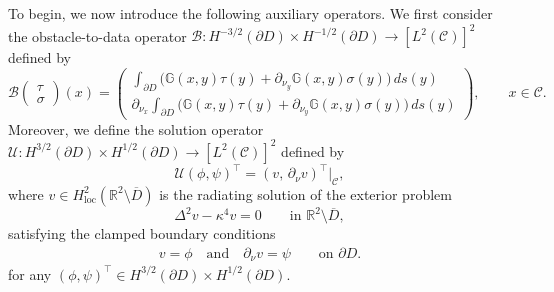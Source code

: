 \documentclass{article}
\begin{document}
To begin, we now introduce the following auxiliary operators. We first consider the obstacle-to-data operator
$\mathcal B : H^{-3/2}(\partial D)\times H^{-1/2}(\partial D)
\to [L^2(\mathcal C)]^2$ defined by
\begin{equation}
\mathcal B
\begin{pmatrix}
\tau\\
\sigma
\end{pmatrix}(x)
=
\begin{pmatrix}
\displaystyle
\int_{\partial D}
\Big(
\mathbb G(x,y)\tau(y)
+
\partial_{\nu_y}\mathbb G(x,y)\sigma(y)
\Big)\,ds(y)
\\[2ex]
\displaystyle
\partial_{\nu_x}
\int_{\partial D}
\Big(
\mathbb G(x,y)\tau(y)
+
\partial_{\nu_y}\mathbb G(x,y)\sigma(y)
\Big)\,ds(y)
\end{pmatrix},
\qquad x \in \mathcal C.
\end{equation}
Moreover, we define the solution operator
$\mathcal U : H^{3/2}(\partial D)\times H^{1/2}(\partial D)
\to [L^2(\mathcal C)]^2$
defined by
\begin{equation}\label{soln_operator}
\mathcal U(\phi, \psi)^\top = \left(v, \, \partial_{\nu} v\right)^\top\Big|_{\mathcal C},
\end{equation}
where $v \in H^2_{\mathrm{loc}}(\mathbb R^2\setminus\overline D)$ is the radiating solution of the exterior problem
\begin{equation}\label{ext_BVP}
\Delta^2 v - \kappa^4 v = 0 
\qquad \text{in } \mathbb{R}^2 \setminus \overline{D},
\end{equation}
satisfying the clamped boundary conditions
\begin{align}\label{clamped_bcs_inhomog}
v = \phi \quad\text{and}\quad \partial_{\nu} v = \psi 
\qquad \text{on } \partial D.
\end{align}
for any $(\phi,\psi)^\top\in H^{3/2}(\partial D)\times H^{1/2}(\partial D)$. 
\end{document}
